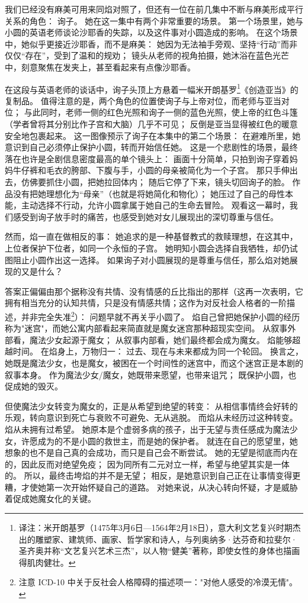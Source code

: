 我们已经没有麻美可用来同焰对照了，但还有一位在前几集中不断与麻美形成平行关系的角色：
询子。
她在这一集中有两个非常重要的场景。
第一个场景里，她与小圆的英语老师谈论沙耶香的失踪，以及这件事对小圆造成的影响。
在这个场景中，她似乎更接近沙耶香，而不是麻美：
她因为无法袖手旁观、坚持“行动”而非仅仅“存在”，受到了温和的规劝；
镜头从老师的视角拍摄，她沐浴在蓝色光芒中，刻意聚焦在发夹上，甚至看起来有点像沙耶香。

在这段与英语老师的谈话中，询子头顶上方悬着一幅米开朗基罗\footnote{%
    译注：米开朗基罗（1475年3月6日—1564年2月18日），意大利文艺复兴时期杰出的雕塑家、建筑师、画家、哲学家和诗人，与列奥纳多·达芬奇和拉斐尔·圣齐奥并称“文艺复兴艺术三杰”，以人物“健美”著称，即使女性的身体也描画得肌肉健壮。
}《创造亚当》的复制品。
值得注意的是，两个角色的位置使询子与上帝对位，而老师与亚当对位；
与此同时，老师一侧的红色光照和询子一侧的蓝色光照，使上帝的红色斗篷（学者曾将其分别比作子宫\cite{ref66}和大脑\cite{ref67}）几乎不可见；
反倒是亚当显得被红色的暖意安全地包裹起来。
这一图像预示了询子在本集中的第二个场景：
在避难所里，她意识到自己必须停止保护小圆，转而开始信任她。
这是一个悲剧性的场景，最终落在也许是全剧信息密度最高的单个镜头上：
画面十分简单，只拍到询子穿着妈妈牛仔裤和毛衣的胯部、下腹与手，小圆的母亲被简化为一个子宫。
那只手伸出去，仿佛要抓住小圆，把她拉回体内；
随后它停了下来，镜头切回询子的脸。
作品没有把她理想化为“母亲”（也就是将她简化和物化）；
她压过了自己的母性本能，主动选择不行动，允许小圆拿属于她自己的生命去冒险。
观看这一幕时，我们感受到询子放手时的痛苦，也感受到她对女儿展现出的深切尊重与信任。

然而，焰一直在做相反的事：
她追求的是一种基督教式的救赎理想，在这其中，上位者保护下位者，如同一个永恒的子宫。
她明知小圆会选择自我牺牲，却仍试图阻止小圆作出这一选择。
如果询子对小圆展现的是尊重与信任，那么焰对她展现的又是什么？

答案正偏偏由那个据称没有共情、没有情感的丘比指出的那样（这再一次表明，它拥有相当充分的认知共情，只是没有情感共情；这作为对反社会人格者的一阶描述，并非完全失准\footnote{%
    注意 ICD-10 中关于反社会人格障碍的描述项一："对他人感受的冷漠无情"。
}\cite{ref68}）：
问题早就不再关乎小圆了。
焰自己曾把她保护小圆的经历称为"迷宫"，而她公寓内部看起来简直就是魔女迷宫那种超现实空间。
从叙事外部看，魔法少女起源于魔女；
从叙事内部看，她们最终都会成为魔女。
焰能够超越时间。
在焰身上，万物归一：
过去、现在与未来都成为同一个轮回。
换言之，她既是魔法少女，也是魔女，被困在一个时间性的迷宫中，而这个迷宫正是本剧的叙事本身。
作为魔法少女/魔女，她既带来愿望，也带来诅咒；
既保护小圆，也促成她的毁灭。

但使魔法少女转变为魔女的，正是从希望到绝望的转变：
从相信事情终会好转的乐观，转向意识到死亡与衰败不可避免、无从逃脱。
而焰从未经历过这种转变。
焰从未拥有过希望。
她原本是个虚弱多病的孩子，出于无望与责任感成为魔法少女，许愿成为的不是小圆的救世主，而是她的保护者。
就连在自己的愿望里，她想象的也不是自己真的会成功，而只是自己会不断尝试。
她的无望是彻底而内在的，因此反而对绝望免疫；
因为同所有二元对立一样，希望与绝望其实是一体的。
所以，最终击垮焰的并不是无望；
相反，是她意识到自己正在让事情变得更糟，才使她第一次开始怀疑自己的道路。
对她来说，从决心转向怀疑，才是威胁着促成她魔女化的关键。

